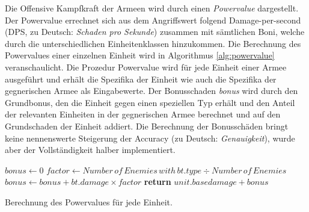 Die Offensive Kampfkraft der Armeen wird durch einen \textit{Powervalue} dargestellt. Der Powervalue errechnet sich aus dem Angriffswert folgend Damage-per-second (DPS, zu Deutsch: \textit{Schaden pro Sekunde}) zusammen mit sämtlichen Boni, welche durch die unterschiedlichen Einheitenklassen hinzukommen. Die Berechnung des Powervalues einer einzelnen Einheit wird in Algorithmus \ref{alg:powervalue} veranschaulicht. Die Prozedur Powervalue wird für jede Einheit einer Armee ausgeführt und erhält die Spezifika der Einheit wie auch die Spezifika der gegnerischen Armee als Eingabewerte. Der Bonusschaden \textit{bonus} wird durch den Grundbonus, den die Einheit gegen einen speziellen Typ erhält und den Anteil der relevanten Einheiten in der gegnerischen Armee berechnet und auf den Grundschaden der Einheit addiert. Die Berechnung der Bonusschäden bringt keine nennenswerte Steigerung der Accuracy (zu Deutsch: \textit{Genauigkeit}), wurde aber der Vollständigkeit halber implementiert. 


\begin{algorithm}
\begin{algorithmic}[1]
	\State $bonus \leftarrow 0$
			\State $factor \leftarrow Number\,of\,Enemies\,with\,bt.type \div Number\,of\,Enemies$
			\State $bonus \leftarrow bonus + bt.damage \times factor$
		\EndIf
	\EndFor
	\State \textbf{return} $ unit.basedamage + bonus$
\EndProcedure
\end{algorithmic}
\caption{Berechnung des Powervalues für jede Einheit.}
\label{alg:powervalue}
\end{algorithm}

